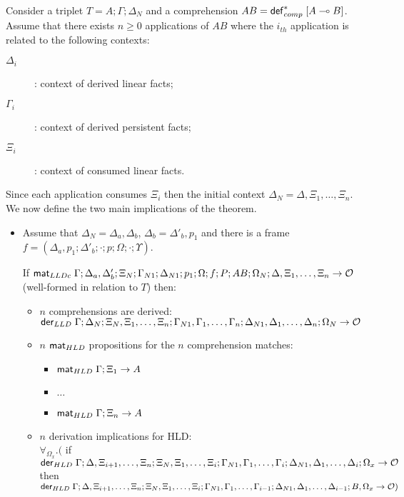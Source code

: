 \begin{theorem}\label{thm:multiple_comprehension_derivation}
Consider a triplet $T = A; \Gamma; \Delta_{N}$ and a comprehension $AB =
\mathsf{def}_{comp}^{*} \; [A \multimap B]$. Assume that there exists $n \geq 0$ applications of $AB$
where the $i_{th}$ application is related to the following contexts:
\begin{description}
   \item[$\Delta_i$]: context of derived linear facts;
   \item[$\Gamma_i$]: context of derived persistent facts;
   \item[$\Xi_i$]: context of consumed linear facts.
\end{description}

Since each application consumes $\Xi_i$ then the initial context $\Delta_N =
\Delta, \Xi_1, \dotsc, \Xi_n$. We now define the two main implications of the
theorem.

\begin{itemize}[leftmargin=*]
   \item Assume that $\Delta_N = \Delta_a, \Delta_b$, $\Delta_b =
   \Delta'_b, p_1$ and there is a frame $f = (\Delta_a, p_1; \Delta'_b; \cdot;
         p; \Omega; \cdot; \Upsilon)$.

   If $\mathsf{mat}_{LLDc} \; \Gamma; \Delta_a, \Delta'_b; \Xi_N; \Gamma_{N1}; \Delta_{N1}; p_1;
   \Omega; f; P; AB; \Omega_N; \Delta, \Xi_1, \dotsc, \Xi_n \rightarrow \mathcal{O}$ (well-formed in relation to $T$) then:

   \begin{itemize}[leftmargin=\secondm]
      \item $n$ comprehensions are derived:\\
      $\mathsf{der}_{LLD} \; \Gamma; \Delta_N; \Xi_N, \Xi_1, \dotsc, \Xi_n; \Gamma_{N1},
      \Gamma_1, \dotsc, \Gamma_n; \Delta_{N1}, \Delta_1, \dotsc, \Delta_n; \Omega_N \rightarrow \mathcal{O}$
      \item $n$ $\mathsf{mat}_{HLD} \;$propositions for the $n$ comprehension matches:
      \begin{itemize}[leftmargin=\thirdm]
         \item $\mathsf{mat}_{HLD} \; \Gamma; \Xi_1 \rightarrow A$
         \item $\dots$
         \item $\mathsf{mat}_{HLD} \; \Gamma; \Xi_n \rightarrow A$
      \end{itemize}
      \item $n$ derivation implications for HLD: \\
      $\forall_{\Omega_x}.($ if $\mathsf{der}_{HLD} \; \Gamma; \Delta, \Xi_{i+1}, \dotsc, \Xi_{n}; \Xi_N, \Xi_1,
            \dotsc, \Xi_i; \Gamma_{N1}, \Gamma_1, \dotsc, \Gamma_i; \Delta_{N1},
            \Delta_1, \dotsc, \Delta_i; \Omega_x \rightarrow \mathcal{O}$ then $\mathsf{der}_{HLD} \; \Gamma; \Delta, \Xi_{i+1}, \dotsc, \Xi_{n}; \Xi_N, \Xi_1,
            \dotsc,
            \Xi_i; \Gamma_{N1}, \Gamma_1, \dotsc, \Gamma_{i-1}; \Delta_{N1},
            \Delta_1, \dotsc, \Delta_{i-1}; B, \Omega_x \rightarrow \mathcal{O})$
   \end{itemize}


\end{itemize}
\end{theorem}
